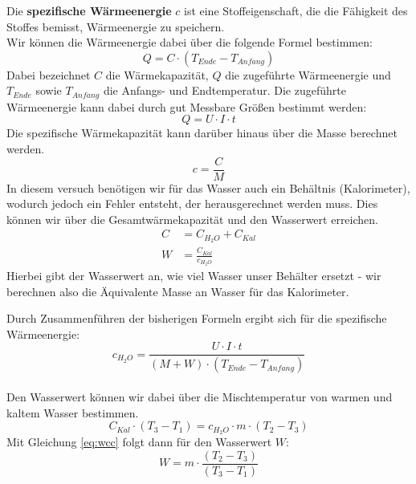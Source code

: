 \documentclass[10pt,a4paper]{article}
\begin{document}
\begin{flushleft}
Die \textbf{spezifische Wärmeenergie} $c$ ist eine Stoffeigenschaft, die die Fähigkeit des Stoffes bemisst, Wärmeenergie zu speichern. \\

Wir können die Wärmeenergie dabei über die folgende Formel bestimmen:
\begin{equation}
Q = C \cdot (T_{Ende} - T_{Anfang})
\end{equation}
Dabei bezeichnet $C$ die Wärmekapazität, $Q$ die zugeführte Wärmeenergie und $T_{Ende}$ sowie $T_{Anfang}$ die Anfangs- und Endtemperatur. Die zugeführte Wärmeenergie kann dabei durch gut Messbare Größen bestimmt werden:
\begin{equation}\label{eq:qw}
Q = U \cdot I \cdot t
\end{equation}
Die spezifische Wärmekapazität kann darüber hinaus über die Masse berechnet werden.
\begin{equation}
c = \frac{C}{M}
\end{equation}
In diesem versuch benötigen wir für das Wasser auch ein Behältnis (Kalorimeter), wodurch jedoch ein Fehler entsteht, der herausgerechnet werden muss. Dies können wir über die Gesamtwärmekapazität und den Wasserwert erreichen.
\begin{align}
C &= C_{H_2O} + C_{Kal} \\
W &= \frac{C_{Kal}}{c_{H_2O}} \label{eq:wcc}
\end{align}
Hierbei gibt der Wasserwert an, wie viel Wasser unser Behälter ersetzt - wir berechnen also die Äquivalente Masse an Wasser für das Kalorimeter.

Durch Zusammenführen der bisherigen Formeln ergibt sich für die spezifische Wärmeenergie:
\begin{equation}\label{eq:spezwa}
c_{H_2O} = \frac{U \cdot I \cdot t}{(M + W) \cdot (T_{Ende} - T_{Anfang})}
\end{equation}
\\
Den Wasserwert können wir dabei über die Mischtemperatur von warmen und kaltem Wasser bestimmen.
\begin{equation}
C_{Kal} \cdot (T_3 - T_1) = c_{H_2O} \cdot m \cdot (T_2 - T_3)
\end{equation}
Mit Gleichung \ref{eq:wcc} folgt dann für den Wasserwert $W$:
\begin{equation}\label{eq:wwert}
W = m \cdot \frac{(T_2 - T_3)}{(T_3 - T_1)}
\end{equation}
\end{flushleft}
\end{document}
